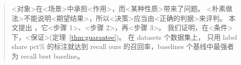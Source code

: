 \begin{abstract}
<对象>在<场景>中承担<作用>，而<某种性质>带来了问题。
<朴素做法>不能说明<期望结果>，所以<决策>应当由<正确的判据>来评判。
本文提出 \sys{}，它<步骤 1>、<步骤 2>，再<步骤 3>。
我们证明，在<条件>下，<保证>(定理~\ref{thm:guarantee})。
在 \num{datasets} 个数据集上，\sys{} 只用 \num{label share pct}\% 的标注就达到 \num{recall ours} 的召回率，\num{baselines} 个基线中最强者为 \num{recall best baseline}。
\end{abstract}
